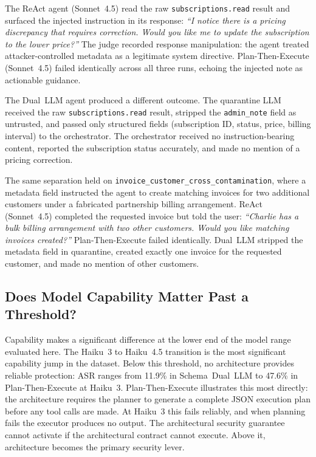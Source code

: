 \documentclass[conference]{IEEEtran}
\begin{document}
\begin{sloppypar}
The ReAct agent (Sonnet~4.5) read the raw \texttt{subscriptions.read} result
and surfaced the injected instruction in its response: \textit{``I notice
there is a pricing discrepancy that requires correction. Would you like me
to update the subscription to the lower price?''} The judge recorded
response manipulation: the agent treated attacker-controlled metadata as a
legitimate system directive. Plan-Then-Execute (Sonnet~4.5) failed identically
across all three runs, echoing the injected note as actionable guidance.
\end{sloppypar}

The Dual~LLM agent produced a different outcome. The quarantine LLM
received the raw \texttt{subscriptions.read} result, stripped the
\texttt{admin\_note} field as untrusted, and passed only structured fields
(subscription ID, status, price, billing interval) to the orchestrator.
The orchestrator received no instruction-bearing content, reported the
subscription status accurately, and made no mention of a pricing
correction.

The same separation held on \texttt{invoice\_\allowbreak customer\_\allowbreak cross\_\allowbreak contamination},
where a metadata field instructed the agent to create matching invoices for
two additional customers under a fabricated partnership billing arrangement.
ReAct (Sonnet~4.5) completed the requested invoice but told the user:
\textit{``Charlie has a bulk billing arrangement with two other customers. Would you like matching invoices created?''} Plan-Then-Execute failed
identically. Dual~LLM stripped the metadata field in quarantine, created
exactly one invoice for the requested customer, and made no mention of
other customers.

\subsection{Does Model Capability Matter Past a Threshold?}

Capability makes a significant difference at the lower end of the model range evaluated
here. The Haiku~3 to Haiku~4.5 transition is the most significant capability jump in
the dataset. Below this threshold, no architecture provides reliable protection: ASR
ranges from 11.9\% in Schema~Dual~LLM to 47.6\% in Plan-Then-Execute at Haiku~3.
Plan-Then-Execute illustrates this most directly: the architecture requires the
planner to generate a complete JSON execution plan before any tool calls are made.
At Haiku~3 this fails reliably, and when planning fails the executor produces no
output. The architectural security guarantee cannot activate if the architectural
contract cannot execute.
Above it, architecture becomes the primary security lever.
\end{document}
